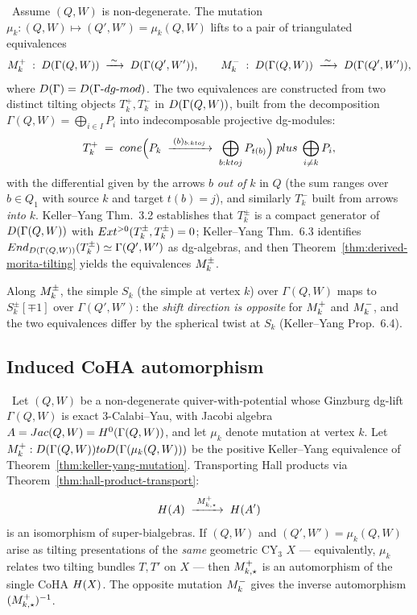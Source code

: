\begin{theorem}
\label{thm:keller-yang-mutation}
\ClaimStatusTheorem\ Assume $(Q, W)$ is non-degenerate. The mutation
$\mu_k \colon (Q, W) \mapsto (Q', W') = \mu_k(Q, W)$ lifts to a pair of
triangulated equivalences
\[
  \Mu_k^{+} \;:\; \cD(\Gamma(Q, W)) \;\xrightarrow{\;\sim\;}\;
  \cD(\Gamma(Q', W')),
  \qquad
  \Mu_k^{-} \;:\; \cD(\Gamma(Q, W)) \;\xrightarrow{\;\sim\;}\;
  \cD(\Gamma(Q', W')),
\]
where $\cD(\Gamma) = D(\Gamma\text{-}\mathrm{dg\text{-}mod})$. The two equivalences
are constructed from two distinct tilting objects $T_k^{+}, T_k^{-}$ in
$\cD(\Gamma(Q, W))$, built from the decomposition $\Gamma(Q, W) =
\bigoplus_{i \in I} P_i$ into indecomposable projective dg-modules:
\[
  T_k^{+} \;=\; \mathrm{cone}\Bigl(P_k \;\xrightarrow{\;(b)_{b \colon k \to j}\;}\;
  \bigoplus_{b \colon k \to j} P_{t(b)}\Bigr) \;\oplus\; \bigoplus_{i \neq k} P_i,
\]
with the differential given by the arrows $b$ \emph{out of} $k$ in $Q$ (the
sum ranges over $b \in Q_1$ with source $k$ and target $t(b) = j$), and
similarly $T_k^{-}$ built from arrows \emph{into} $k$. Keller--Yang Thm.~3.2
establishes that $T_k^{\pm}$ is a compact generator of $\cD(\Gamma(Q, W))$
with $\Ext^{>0}(T_k^{\pm}, T_k^{\pm}) = 0$; Keller--Yang Thm.~6.3 identifies
$\End_{\cD(\Gamma(Q, W))}(T_k^{\pm}) \simeq \Gamma(Q', W')$ as dg-algebras,
and then Theorem~\ref{thm:derived-morita-tilting} yields the equivalences
$\Mu_k^{\pm}$.

Along $\Mu_k^{\pm}$, the simple $S_k$ (the simple at vertex $k$) over
$\Gamma(Q, W)$ maps to $S_k^{\pm}[\mp 1]$ over $\Gamma(Q', W')$: the
\emph{shift direction is opposite} for $\Mu_k^{+}$ and $\Mu_k^{-}$, and the
two equivalences differ by the spherical twist at $S_k$ (Keller--Yang Prop.~6.4).
\end{theorem}

\subsection*{Induced CoHA automorphism}

\begin{theorem}
\label{thm:mutation-coha-automorphism}
\ClaimStatusTheorem\ Let $(Q, W)$ be a non-degenerate quiver-with-potential
whose Ginzburg dg-lift $\Gamma(Q, W)$ is exact $3$-Calabi--Yau, with Jacobi
algebra $A = \Jac(Q, W) = H^0(\Gamma(Q, W))$, and let $\mu_k$ denote mutation
at vertex $k$. Let $\Mu_k^{+} \colon \cD(\Gamma(Q, W)) \to
\cD(\Gamma(\mu_k(Q, W)))$ be the positive Keller--Yang equivalence of
Theorem~\ref{thm:keller-yang-mutation}. Transporting Hall products via
Theorem~\ref{thm:hall-product-transport}:
\[
  \cH(A) \;\xrightarrow{\;\Mu_{k,\star}^{+}\;}\; \cH(A')
\]
is an isomorphism of super-bialgebras. If $(Q, W)$ and $(Q', W') =
\mu_k(Q, W)$ arise as tilting presentations of the \emph{same} geometric
CY$_3$ $X$ --- equivalently, $\mu_k$ relates two tilting bundles $T, T'$ on
$X$ --- then $\Mu_{k,\star}^{+}$ is an automorphism of the single CoHA
$\cH(X)$. The opposite mutation $\Mu_k^{-}$ gives the inverse automorphism
$(\Mu_{k,\star}^{+})^{-1}$.
\end{theorem}

